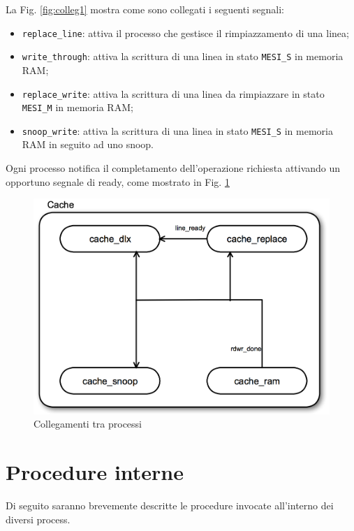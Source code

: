 La Fig. \ref{fig:colleg1} mostra come sono collegati i seguenti segnali:
\begin{itemize}
  \item \texttt{replace\_line}: attiva il processo che gestisce il rimpiazzamento di una linea;
  \item \texttt{write\_through}: attiva la scrittura di una linea in stato \texttt{MESI\_S} in memoria RAM;
  \item \texttt{replace\_write}: attiva la scrittura di una linea da rimpiazzare in stato \texttt{MESI\_M} in memoria RAM;
  \item \texttt{snoop\_write}: attiva la scrittura di una linea in stato \texttt{MESI\_S} in memoria RAM in seguito ad uno snoop.
\end{itemize}

Ogni processo notifica il completamento dell'operazione richiesta attivando un opportuno segnale di ready, come mostrato in Fig. \ref{fig:colleg2}

\begin{figure}[h!]
\centering
\includegraphics[width=\textwidth]{img/cache/collegamenti2.png}
\caption{Collegamenti tra processi}
\label{fig:colleg2}
\end{figure}


\section{Procedure interne}

Di seguito saranno brevemente descritte le procedure invocate all'interno dei diversi process.%


